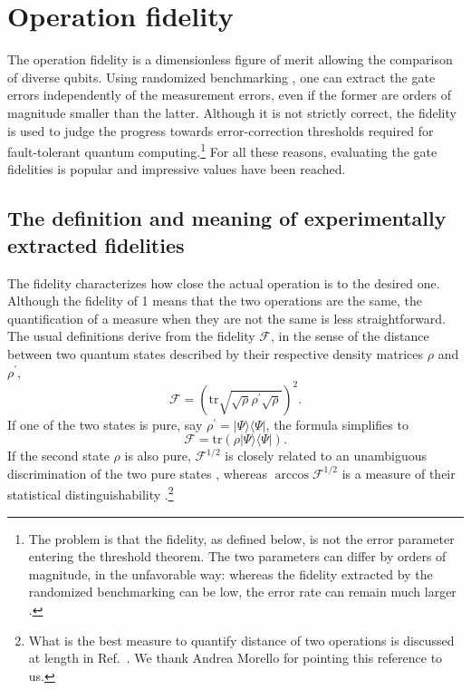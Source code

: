 \documentclass[aps, prx, showpacs, twocolumn, superscriptaddress, notitlepage, longbibliography, floatfix, nofootinbib]{revtex4-2}
\begin{document}
\section{Operation fidelity}


The operation fidelity is a dimensionless figure of merit allowing the comparison of diverse qubits. Using randomized benchmarking \cite{epstein_investigating_2014}, one can extract the gate errors independently of the measurement errors, even if the former are orders of magnitude smaller than the latter. Although it is not strictly correct, the fidelity is used to judge the progress towards error-correction thresholds required for fault-tolerant quantum computing.\footnote{The problem is that the fidelity, as defined below, is not the error parameter entering the threshold theorem. The two parameters can differ by orders of magnitude, in the unfavorable way: whereas the fidelity extracted by the randomized benchmarking can be low, the error rate can remain much larger \cite{sanders_bounding_2015,blume-kohout_demonstration_2017}. } For all these reasons, evaluating the gate fidelities is popular and impressive values have been reached. 

\subsection{The definition and meaning of experimentally extracted fidelities}

\label{sec:fidelityDefinition}

The fidelity characterizes how close the actual operation is to the desired one. Although the fidelity of 1 means that the two operations are the same, the quantification of a measure when they are not the same is less straightforward. The usual definitions derive from the fidelity $\mathcal{F}$, in the sense of the distance between two quantum states described by their respective density matrices $\rho$ and $\rho^\prime$,
\begin{equation}
\mathcal{F} = \left( \mathrm{tr}\sqrt{\sqrt{\rho}\rho^\prime \sqrt{\rho}} \right)^2.
\label{eq:fidelity1}
\end{equation}
If one of the two states is pure, say $\rho^\prime = |\Psi\rangle \langle \Psi|$, the formula simplifies to
\begin{equation}
\mathcal{F} = \mathrm{tr} \left(  \rho |\Psi\rangle\langle \Psi| \right).
\label{eq:fidelity2}
\end{equation}
If the second state $\rho$ is also pure, $\mathcal{F}^{1/2}$ is closely related to an unambiguous discrimination of the two pure states \cite{heinosaari_guide_2008}, whereas $\arccos \mathcal{F}^{1/2}$ is a measure of their statistical distinguishability \cite{wootters_statistical_1981}.\footnote{What is the best measure to quantify distance of two operations is discussed at length in Ref.~\cite{gilchrist_distance_2005}. We thank Andrea Morello for pointing this reference to us.}
\end{document}
